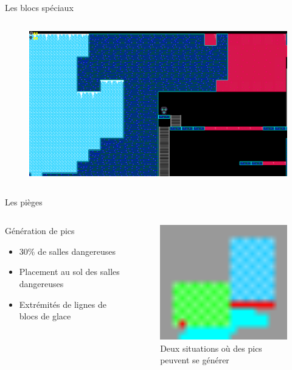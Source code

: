 \documentclass{beamer}
\begin{document}
{\begin{frame}{Les blocs spéciaux}
\begin{columns}
\begin{figure}
            \includegraphics[width=1.0\textwidth]{perlin_noise_in_level}
        \end{figure}
    \end{columns}
\end{frame}

\begin{frame}{Les pièges}
    \begin{columns}
        \begin{block}{Génération de pics}
            \begin{itemize}
                \item[\bullet] 30\% de salles dangereuses
                \item[\bullet] Placement au sol des salles dangereuses
                \item[\bullet] Extrémités de lignes de blocs de glace
            \end{itemize}
        \end{block}
        \begin{figure}
            \centering
            \includegraphics[width=1.0\textwidth]{ice_spike_trap}
            \caption{Deux situations où des pics peuvent se générer}
        \end{figure}
    \end{columns}
\end{frame}

}
\end{document}
